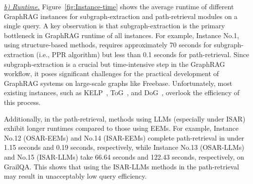 


{\it \underline{b) Runtime.}} Figure~\ref{fig:Instance-time} shows the average runtime of different GraphRAG instances for subgraph-extraction and path-retrieval modules on a single query.
A key observation is that subgraph-extraction is the primary bottleneck in GraphRAG runtime of all instances. 
For example, Instance No.1, using structure-based methods, requires approximately 70 seconds for subgraph-extraction (i.e., PPR algorithm) but less than 0.1 seconds for path-retrieval.
Since subgraph-extraction is a crucial but time-intensive step in the GraphRAG workflow, it poses significant challenges for the practical development of GraphRAG systems on large-scale graphs like Freebase.
Unfortunately, most existing instances, such as KELP~\cite{ref:kelp}, ToG~\cite{ToG}, and DoG~\cite{DoG}, overlook the efficiency of this process. 

Additionally, in the path-retrieval, methods using LLMs (especially under ISAR) exhibit  longer runtimes compared to those using EEMs.
For example, Instance No.12 (OSAR-EEMs) and No.14 (ISAR-EEMs) complete path-retrieval in under 1.15 seconds and 0.19 seconds, respectively, while Instance No.13 (OSAR-LLMs) and No.15 (ISAR-LLMs) take 66.64 seconds and 122.43 seconds, respectively, on GrailQA. 
This shows that using the ISAR-LLMs methods in the path-retrieval  may result in 
unacceptably low query efficiency.



